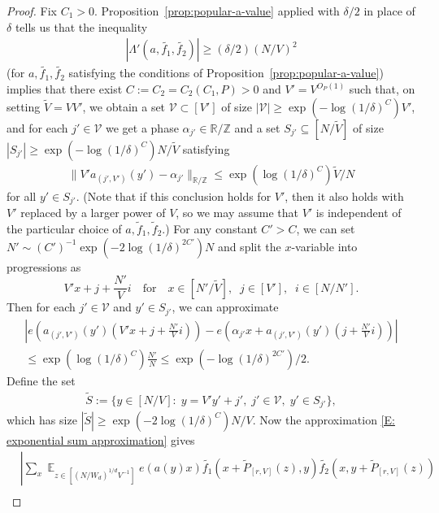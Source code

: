 \documentclass[11pt]{amsart}
\theoremstyle{definition}
\DeclareMathOperator*{\E}{\mathbb{E}}
\newcommand{\R}{{\mathbb R}}
\newcommand{\Z}{{\mathbb Z}}
\newcommand{\CV}{{\mathcal V}}
\newcommand{\abs}[1]{\mathopen{}\left| #1\mathclose{}\right|}
\newcommand{\brac}[1]{\mathopen{}\left( #1 \mathclose{}\right)}
\begin{document}
\begin{proof}
Fix $C_1>0$. Proposition~\ref{prop:popular-a-value} applied with $\delta/2$ in place of $\delta$ tells us that the inequality 
 \begin{align}\label{E: Lambda' with delta/2}
    |\Lambda'({a},\widetilde{f_1}, \widetilde{f_2})| \geq (\delta/2) (N/V)^{2}    
 \end{align}
(for $a, \widetilde{f_1}, \widetilde{f_2}$ satisfying the conditions of Proposition~\ref{prop:popular-a-value}) implies that there exist $C:=C_2 = C_2(C_1, P)>0$ and $V' = V^{O_P(1)}$ such that, on setting $\tilde{V} = VV'$, we obtain a set $\CV\subset[V']$ of size $|\CV|\geq \exp(-\log(1/\delta)^{C})V'$, and for each $j'\in\CV$ we get a phase $\alpha_{j'} \in \mathbb{R}/\mathbb{Z}$ and a set $S_{j'} \subseteq [N/\tilde{V}]$ of size $|S_{j'}| \geq \exp(-\log(1/\delta)^{C}) N/\tilde{V}$ satisfying
\begin{align}\label{E: approximation of a}
    \|V' a_{({j'}, V')}(y')-\alpha_{j'}\|_{\R/\Z} \leq \exp(\log(1/\delta)^{C}) \tilde{V}/N
\end{align}
for all $y' \in S_{j'}$.  (Note that if this conclusion holds for $V'$, then it also holds with $V'$ replaced by a larger power of $V$, so we may assume that $V'$ is independent of the particular choice of $a, \widetilde f_1,\widetilde f_2$.)  For any constant $C'>C$, we can set $N'\sim (C')^{-1}\exp(-2\log(1/\delta)^{2C'})N$ and split the $x$-variable into progressions as
$$V'x + j + \frac{N'}{V}i\quad \textrm{for}\quad x\in [N'/\tilde{V}],\;\; j\in[V'],\;\; i\in [N/N'].$$ 
Then for each $j'\in\CV$ and $y'\in S_{j'}$, we can approximate
\begin{multline}\label{E: exponential sum approximation}
    \abs{e\brac{a_{({j'}, V')}(y')\brac{V'x + j+\frac{N'}{V}i}}-e\brac{\alpha_{j'} x + a_{({j'}, V')}(y')\brac{j+\frac{N'}{V}i}}}\\
    \leq \exp(\log(1/\delta)^{C})\frac{N'}{N}\leq  \exp(-\log(1/\delta)^{2C'})/2.
\end{multline}
Define the set
\begin{align*}
    \tilde{S} := \{y\in[N/V]:\; y = V'y'+j',\; j'\in\CV,\; y' \in S_{j'}\},
\end{align*}
which has size $|\tilde{S}| \geq \exp(-2\log(1/\delta)^{C}) N/V$.   Now the approximation \eqref{E: exponential sum approximation} gives
\begin{align*}
    &\left|\sum_{x} \E_{z \in [(N/W_d)^{1/d}V^{-1}]} e(a(y)x)\widetilde{f_1}(x+\widetilde P_{[r, V]}(z),y)\widetilde{f_2}(x,y+\widetilde P_{[r, V]}(z))\right.\\

\end{align*}
\end{proof}
\end{document}
